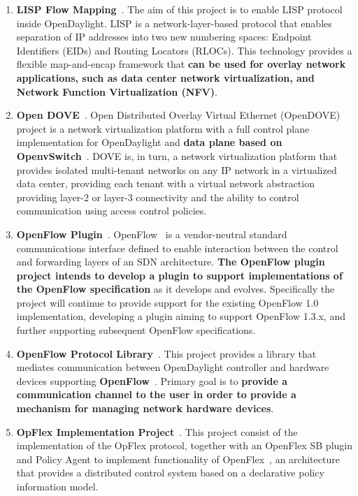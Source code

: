 \documentclass[a4paper, 12pt]{book}
\begin{document}
\begin{enumerate}
\item{\textbf{LISP Flow Mapping}}~\cite{OpenDaylightWikiLISP}. The aim of this project is to enable LISP protocol~\cite{LISP} inside OpenDaylight. LISP is a network-layer-based protocol that enables separation of IP addresses into two new numbering spaces: Endpoint Identifiers (EIDs) and Routing Locators (RLOCs). This technology provides a flexible map-and-encap framework that \textbf{can be used for overlay network applications, such as data center network virtualization, and Network Function Virtualization (NFV)}.
\item{\textbf{Open DOVE}}~\cite{OpenDaylightWikiOpenDove}. Open Distributed Overlay Virtual Ethernet (OpenDOVE) project is a network virtualization platform with a full control plane implementation for OpenDaylight and \textbf{data plane based on OpenvSwitch}~\cite{OVS}. DOVE is, in turn,  a network virtualization platform that provides isolated multi-tenant networks on any IP network in a virtualized data center, providing each tenant with a virtual network abstraction providing layer-2 or layer-3 connectivity and the ability to control communication using access control policies.
\item{\textbf{OpenFlow Plugin}}~\cite{OpenDaylightWikiOpenFlowPlugin}. OpenFlow~\cite{OpenFlow} is a vendor-neutral standard communications interface defined to enable interaction between the control and forwarding layers of an SDN architecture. \textbf{The OpenFlow plugin project intends to develop a plugin to support implementations of the OpenFlow specification} as it develops and evolves. Specifically the project will continue to provide support for the existing OpenFlow 1.0 implementation, developing a plugin aiming to support OpenFlow 1.3.x, and further supporting subsequent OpenFlow specifications.
\item{\textbf{OpenFlow Protocol Library}}~\cite{OpenDaylightWikiOpenFlowLib}. This project provides a library that mediates communication between OpenDaylight controller and hardware devices supporting \textbf{OpenFlow}~\cite{OpenFlow}. Primary goal is to \textbf{provide a communication channel to the user in order to provide a mechanism for managing network hardware devices}.
\item{\textbf{OpFlex Implementation Project}}~\cite{OpenDaylightWikiOpenFlowLib}. This project consist of the implementation of the OpFlex protocol, together with an OpenFlex SB plugin and Policy Agent to implement functionality of OpenFlex~\cite{OpFlex}, an architecture that provides a distributed control system based on a declarative policy information model.

\end{enumerate}
\end{document}
